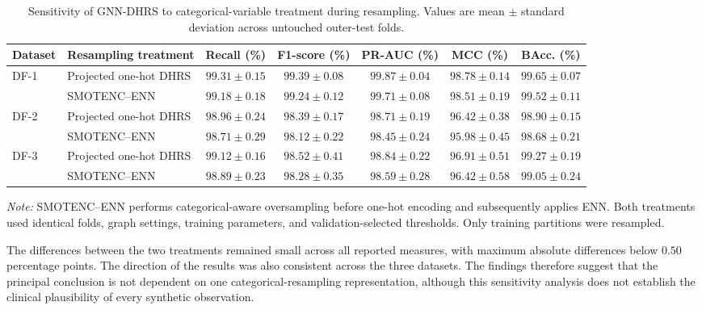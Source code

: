 \documentclass[pdflatex,sn-mathphys-num]{sn-jnl}%
\theoremstyle{thmstyleone}%
\theoremstyle{thmstyletwo}%
\theoremstyle{thmstylethree}%
\begin{document}
\begingroup
 
\begin{table}[!ht]
\centering
\caption{
Sensitivity of GNN-DHRS to categorical-variable treatment during resampling.
Values are mean \(\pm\) standard deviation across untouched outer-test folds.
}
\label{tab:mixed_resampling_sensitivity}
\scriptsize
\setlength{\tabcolsep}{3.6pt}
\renewcommand{\arraystretch}{1.05}
\begin{tabular}{@{}llccccc@{}}
\toprule
\textbf{Dataset} &
\textbf{Resampling treatment} &
\textbf{Recall (\%)} &
\textbf{F1-score (\%)} &
\textbf{PR-AUC (\%)} &
\textbf{MCC (\%)} &
\textbf{BAcc. (\%)} \\
\midrule
\multirow{2}{*}{DF-1}
& Projected one-hot DHRS
& $99.31\pm0.15$ & $99.39\pm0.08$ & $99.87\pm0.04$
& $98.78\pm0.14$ & $99.65\pm0.07$ \\
& SMOTENC--ENN
& $99.18\pm0.18$ & $99.24\pm0.12$ & $99.71\pm0.08$
& $98.51\pm0.19$ & $99.52\pm0.11$ \\
\midrule
\multirow{2}{*}{DF-2}
& Projected one-hot DHRS
& $98.96\pm0.24$ & $98.39\pm0.17$ & $98.71\pm0.19$
& $96.42\pm0.38$ & $98.90\pm0.15$ \\
& SMOTENC--ENN
& $98.71\pm0.29$ & $98.12\pm0.22$ & $98.45\pm0.24$
& $95.98\pm0.45$ & $98.68\pm0.21$ \\
\midrule
\multirow{2}{*}{DF-3}
& Projected one-hot DHRS
& $99.12\pm0.16$ & $98.52\pm0.41$ & $98.84\pm0.22$
& $96.91\pm0.51$ & $99.27\pm0.19$ \\
& SMOTENC--ENN
& $98.89\pm0.23$ & $98.28\pm0.35$ & $98.59\pm0.28$
& $96.42\pm0.58$ & $99.05\pm0.24$ \\
\bottomrule
\end{tabular}

\vspace{2pt}
\begin{minipage}{0.98\textwidth}
\footnotesize
\textit{Note:} SMOTENC--ENN performs categorical-aware oversampling before
one-hot encoding and subsequently applies ENN. Both treatments used identical
folds, graph settings, training parameters, and validation-selected
thresholds. Only training partitions were resampled.
\end{minipage}
\end{table}
\endgroup

 {
The differences between the two treatments remained small across all reported
measures, with maximum absolute differences below \(0.50\) percentage points.
The direction of the results was also consistent across the three datasets.
The findings therefore suggest that the principal conclusion is not dependent
on one categorical-resampling representation, although this sensitivity
analysis does not establish the clinical plausibility of every synthetic
observation.
}
\end{document}
